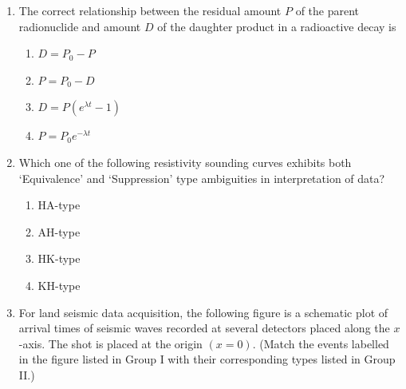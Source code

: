\documentclass[journal,12pt,onecolumn]{IEEEtran}
\begin{document}
\begin{enumerate}
\begin{enumerate}
\hfill{}

\begin{multicols}{4}
\begin{enumerate}[label=(\Alph*)]
\item $0.1$
\item $0.01$
\item $0.001$
\item $0.0001$
\end{enumerate}
\end{multicols}

\item The correct relationship between the residual amount $P$ of the parent radionuclide and amount $D$ of the daughter product in a radioactive decay is

\hfill{}

\begin{multicols}{2}
\begin{enumerate}[label=(\Alph*)]
\item $D=P_0-P$
\item $P=P_0-D$
\item $D=P\left(e^{\lambda t}-1\right)$
\item $P=P_0e^{-\lambda t}$
\end{enumerate}
\end{multicols}

\item Which one of the following resistivity sounding curves exhibits both `Equivalence' and `Suppression' type ambiguities in interpretation of data?

\hfill{}


\begin{enumerate}[label=(\Alph*)]
\item HA-type
\item AH-type
\item HK-type
\item KH-type
\end{enumerate}


\newpage

\item For land seismic data acquisition, the following figure is a schematic plot of arrival times of seismic waves recorded at several detectors placed along the $x$-axis. The shot is placed at the origin $(x=0)$. (Match the events labelled in the figure listed in Group I with their corresponding types listed in Group II.)


\end{enumerate}
\end{enumerate}
\end{document}
